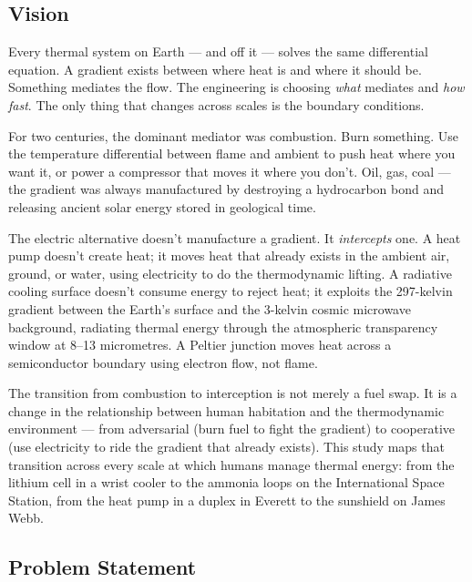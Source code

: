 \documentclass[11pt,letterpaper]{article}
\begin{document}
\subsection{Vision}

Every thermal system on Earth --- and off it --- solves the same differential equation. A gradient exists between where heat is and where it should be. Something mediates the flow. The engineering is choosing \textit{what} mediates and \textit{how fast}. The only thing that changes across scales is the boundary conditions.

For two centuries, the dominant mediator was combustion. Burn something. Use the temperature differential between flame and ambient to push heat where you want it, or power a compressor that moves it where you don't. Oil, gas, coal --- the gradient was always manufactured by destroying a hydrocarbon bond and releasing ancient solar energy stored in geological time.

The electric alternative doesn't manufacture a gradient. It \textit{intercepts} one. A heat pump doesn't create heat; it moves heat that already exists in the ambient air, ground, or water, using electricity to do the thermodynamic lifting. A radiative cooling surface doesn't consume energy to reject heat; it exploits the 297-kelvin gradient between the Earth's surface and the 3-kelvin cosmic microwave background, radiating thermal energy through the atmospheric transparency window at 8--13 micrometres. A Peltier junction moves heat across a semiconductor boundary using electron flow, not flame.

The transition from combustion to interception is not merely a fuel swap. It is a change in the relationship between human habitation and the thermodynamic environment --- from adversarial (burn fuel to fight the gradient) to cooperative (use electricity to ride the gradient that already exists). This study maps that transition across every scale at which humans manage thermal energy: from the lithium cell in a wrist cooler to the ammonia loops on the International Space Station, from the heat pump in a duplex in Everett to the sunshield on James Webb.

\subsection{Problem Statement}
\end{document}
